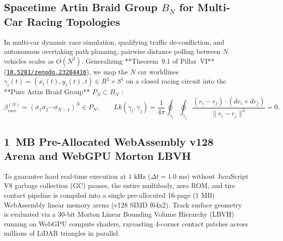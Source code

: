 \documentclass[11pt,a4paper,reqno]{article}
\def\bm#1{#1}%
\def\texttt#1{#1}%
\def\mathrm#1{#1}%
\def\mathcal#1{#1}%
\def\mathbb#1{#1}%
\newcommand{\zenodo}[1]{\href{https://doi.org/10.5281/zenodo.#1}{\nolinkurl{10.5281/zenodo.#1}}}
\theoremstyle{plain}
\theoremstyle{definition}
\theoremstyle{remark}
\numberwithin{equation}{section}
\begin{document}
\subsection{\texorpdfstring{Spacetime Artin Braid Group $\mathcal{B}_N$ for Multi-Car Racing Topologies}{Spacetime Artin Braid Group B\_N for Multi-Car Racing Topologies}}
In multi-car dynamic race simulation, qualifying traffic de-confliction, and autonomous overtaking path planning, pairwise distance polling between $N$ vehicles scales as $\mathcal{O}(N^2)$. Generalizing **Theorem~9.1 of Pillar~VI** (\zenodo{23284416}), we map the $N$ car worldlines $\bm{\gamma}_i(t) = (x_i(t), y_i(t), t) \in \mathbb{R}^2 \times S^1$ on a closed racing circuit into the **Pure Artin Braid Group** $\mathcal{P}_N \subset \mathcal{B}_N$ \cite{Artin1947}:
\begin{equation}
  \beta_{\mathrm{race}}^{(N)} = \left(\sigma_1 \sigma_2 \cdots \sigma_{N-1}\right)^N \in \mathcal{P}_N, \qquad \mathrm{Lk}(\bm{\gamma}_i, \bm{\gamma}_j) = \frac{1}{4\pi}\oint_{\bm{\gamma}_i}\oint_{\bm{\gamma}_j} \frac{(\bm{r}_i - \bm{r}_j) \cdot (d\bm{r}_i \times d\bm{r}_j)}{\|\bm{r}_i - \bm{r}_j\|^3} = 0.
  \label{eq:f1_braid_linking}
\end{equation}

\subsection{\texorpdfstring{1~MB Pre-Allocated WebAssembly \texttt{v128} Arena and WebGPU Morton LBVH}{1 MB Pre-Allocated WebAssembly v128 Arena and WebGPU Morton LBVH}}
To guarantee hard real-time execution at $1\text{ kHz}$ ($\Delta t = 1.0\text{ ms}$) without JavaScript V8 garbage collection (GC) pauses, the entire multibody, aero ROM, and tire contact pipeline is compiled into a single pre-allocated 16-page ($1\text{ MB}$) WebAssembly linear memory arena (\texttt{v128} SIMD \texttt{f64x2}). Track surface geometry is evaluated via a 30-bit Morton Linear Bounding Volume Hierarchy (LBVH) running on WebGPU compute shaders, raycasting 4-corner contact patches across millions of LiDAR triangles in parallel.
\end{document}
